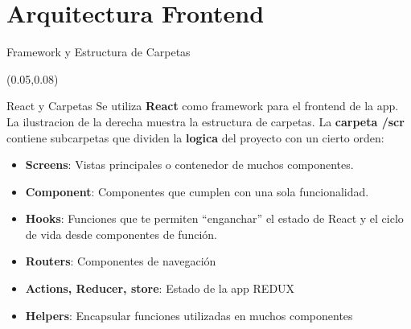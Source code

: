 \documentclass[xcolor=pdftex,dvipsnames,table]{beamer}
\begin{document}
\section{Arquitectura Frontend}
\begin{frame}{Framework y Estructura de Carpetas}\small{
    \begin{textblock*}{0.56\textwidth}(0.05\textwidth,0.08\textwidth)
            \begin{block}{React y Carpetas} 
            \justifying
                Se utiliza \textbf{React} como framework para el frontend de la app. La ilustracion de la derecha muestra la estructura de carpetas. La \textbf{carpeta /scr} contiene subcarpetas que dividen la \textbf{logica} del proyecto con un cierto orden:
                    \vspace{-0.0cm}
                    \footnotesize {
                    \begin{itemize}
                      \setlength\itemsep{0.1em}
                        \item {\textbf{Screens}: Vistas principales o contenedor de muchos componentes.}
                        \item {\textbf{Component}: Componentes que cumplen con una sola funcionalidad.}
                        \item {\textbf{Hooks}: Funciones que te permiten “enganchar” el estado de React y el ciclo de vida desde componentes de función.}
                        \item {\textbf{Routers}: Componentes de navegación}
                        \item {\textbf{Actions, Reducer, store}: Estado de la app REDUX}
                        \item {\textbf{Helpers}: Encapsular funciones utilizadas en muchos componentes}
                    \end{itemize}}
            \end{block}
    \end{textblock*}
    
}
\end{frame}
\end{document}
